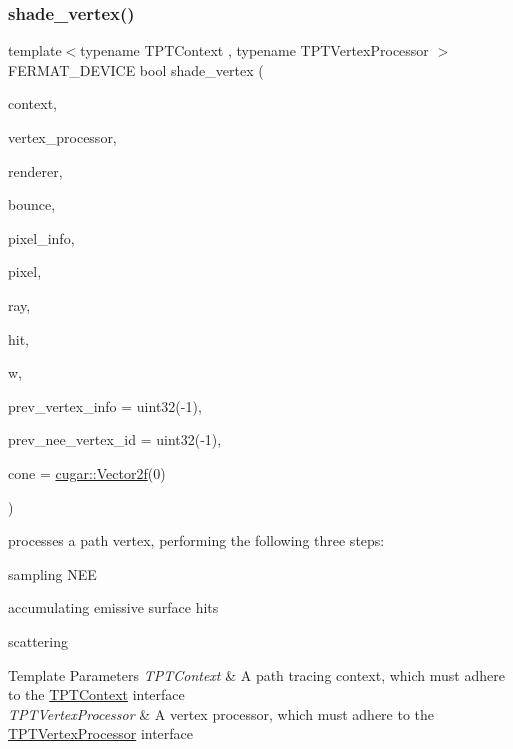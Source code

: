 \subsubsection{\texorpdfstring{shade\+\_\+vertex()}{shade\_vertex()}}
{\footnotesize\ttfamily template$<$typename T\+P\+T\+Context , typename T\+P\+T\+Vertex\+Processor $>$ \\
F\+E\+R\+M\+A\+T\+\_\+\+D\+E\+V\+I\+CE bool shade\+\_\+vertex (\begin{DoxyParamCaption}\item[{T\+P\+T\+Context \&}]{context,  }\item[{T\+P\+T\+Vertex\+Processor \&}]{vertex\+\_\+processor,  }\item[{\hyperlink{struct_rendering_context_view}{Rendering\+Context\+View} \&}]{renderer,  }\item[{const uint32}]{bounce,  }\item[{const \hyperlink{union_pixel_info}{Pixel\+Info}}]{pixel\+\_\+info,  }\item[{const uint2}]{pixel,  }\item[{const \hyperlink{struct_masked_ray}{Masked\+Ray} \&}]{ray,  }\item[{const \hyperlink{struct_hit}{Hit}}]{hit,  }\item[{const \hyperlink{structcugar_1_1_vector}{cugar\+::\+Vector4f}}]{w,  }\item[{const uint32}]{prev\+\_\+vertex\+\_\+info = {\ttfamily uint32(-\/1)},  }\item[{const uint32}]{prev\+\_\+nee\+\_\+vertex\+\_\+id = {\ttfamily uint32(-\/1)},  }\item[{const \hyperlink{structcugar_1_1_vector}{cugar\+::\+Vector2f}}]{cone = {\ttfamily \hyperlink{structcugar_1_1_vector}{cugar\+::\+Vector2f}(0)} }\end{DoxyParamCaption})}

processes a path vertex, performing the following three steps\+: \begin{DoxyParagraph}{}

\begin{DoxyItemize}
\item sampling N\+EE
\item accumulating emissive surface hits
\item scattering
\end{DoxyItemize}
\end{DoxyParagraph}

\begin{DoxyTemplParams}{Template Parameters}
{\em T\+P\+T\+Context} & A path tracing context, which must adhere to the \hyperlink{_p_t_lib_page_TPTContext}{T\+P\+T\+Context} interface \\
\hline
{\em T\+P\+T\+Vertex\+Processor} & A vertex processor, which must adhere to the \hyperlink{_p_t_lib_page_TPTVertexProcessor}{T\+P\+T\+Vertex\+Processor} interface\\
\hline
\end{DoxyTemplParams}

